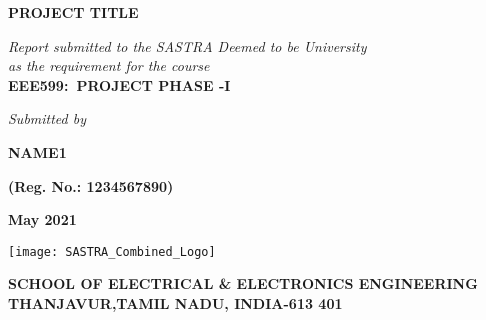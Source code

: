 \documentclass[a4paper, 12pt, oneside]{sastra1}
\begin{document}
\onehalfspacing
	
	\thispagestyle{empty}
	\begin{center}
		\Large{\textbf{PROJECT TITLE}}
	\end{center}
	\bigskip{}
	\bigskip{}
	\bigskip{}
	\begin{center}
		\textit{Report submitted to the SASTRA Deemed to be University\\ 
			as the requirement for the course\\
		}
		\bigskip{}
		\bigskip{}
		\large{\textbf{EEE599:~PROJECT PHASE -I}}
		\bigskip{}
		\bigskip{}
		\bigskip{}
		\bigskip{}
		\bigskip{}
		\bigskip{}
	\end{center}
	\begin{center}
		\textit{Submitted by}\\
	\end{center}
	\begin{center}
		\begin{singlespacing}
				\textbf{\Large{NAME1}}
			
			\textbf{\large{(Reg. No.: 1234567890)}}
		
		\end{singlespacing}
	\end{center}
	\bigskip{}
	
	\begin{center}
		\Large{\textbf{May 2021}}   %
	\end{center}
	\bigskip{}
	\begin{center}
		\texttt{[image: SASTRA\_Combined\_Logo]}
	\end{center}
	
	\begin{center}
		\large{\textbf{SCHOOL OF ELECTRICAL \& ELECTRONICS ENGINEERING}} %
		{\textbf{THANJAVUR,TAMIL NADU, INDIA-613 401}}
	\end{center}
	
	
	\newpage
	
	\setcounter{page}{2}
	
	\certificate
	
	
\end{document}
